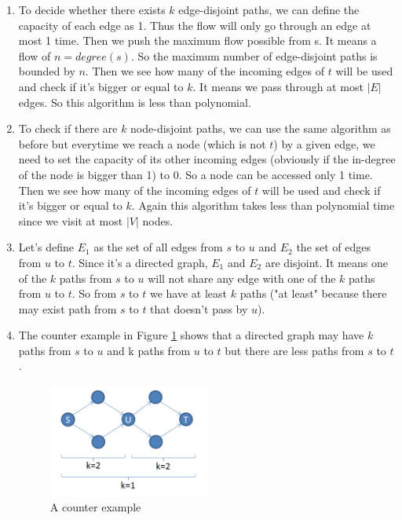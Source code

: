 \begin{enumerate}
	\item To decide whether there exists $k$ edge-disjoint paths, we can define the capacity of each edge as 1. Thus the flow will only go through an edge at most 1 time. Then we push the maximum flow possible from s. It means a flow of $n=degree(s)$. So the maximum number of edge-disjoint paths is bounded by $n$. Then we see how many of the incoming edges of $t$ will be used and check if it's bigger or equal to $k$. It means we pass through at most $|E|$ edges. So this algorithm is less than polynomial.
	\item To check if there are $k$ node-disjoint paths, we can use the same algorithm as before but everytime we reach a node (which is not $t$) by a given edge, we need to set the capacity of its other incoming edges (obviously if the in-degree of the node is bigger than 1) to 0. So a node can be accessed only 1 time. Then we see how many of the incoming edges of $t$ will be used and check if it's bigger or equal to $k$. Again this algorithm takes less than polynomial time since we visit at most $|V|$ nodes.
	\item Let's define $E_1$ as the set of all edges from $s$ to $u$ and $E_2$ the set of edges from $u$ to $t$. Since it's a directed graph, $E_1$ and $E_2$ are disjoint. It means one of the $k$ paths from $s$ to $u$ will not share any edge with one of the $k$ paths from $u$ to $t$. So from $s$ to $t$ we have at least $k$ paths ("at least" because there may exist path from $s$ to $t$ that doesn't pass by $u$).
	\item The counter example in Figure \ref{fig:counterexample} shows that a directed graph may have $k$ paths from $s$ to $u$ and k paths from $u$ to $t$ but there are less paths from $s$ to $t$.
	\begin{figure}[ht]
  \centering
  \includegraphics[width=0.5\textwidth]{counterexample}
  \caption{A counter example}
  \label{fig:counterexample}
  \end{figure}
\end{enumerate}